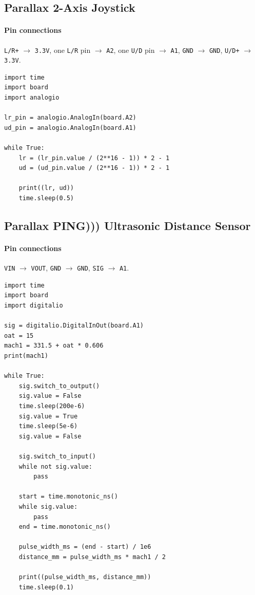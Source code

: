 \documentclass[11pt]{article}
\begin{document}
\subsection{Parallax 2-Axis Joystick}
\paragraph{Pin connections} \texttt{L/R+} $\rightarrow$ \texttt{3.3V}, one \texttt{L/R} pin $\rightarrow$ \texttt{A2}, one \texttt{U/D} pin $\rightarrow$ \texttt{A1}, \texttt{GND} $\rightarrow$ \texttt{GND}, \texttt{U/D+} $\rightarrow$ \texttt{3.3V}.

\begin{lstlisting}
import time
import board
import analogio

lr_pin = analogio.AnalogIn(board.A2)
ud_pin = analogio.AnalogIn(board.A1)

while True:
    lr = (lr_pin.value / (2**16 - 1)) * 2 - 1
    ud = (ud_pin.value / (2**16 - 1)) * 2 - 1

    print((lr, ud))
    time.sleep(0.5)
\end{lstlisting}

\subsection{Parallax PING))) Ultrasonic Distance Sensor}
\paragraph{Pin connections} \texttt{VIN} $\rightarrow$ \texttt{VOUT}, \texttt{GND} $\rightarrow$ \texttt{GND}, \texttt{SIG} $\rightarrow$ \texttt{A1}.

\begin{lstlisting}
import time
import board
import digitalio

sig = digitalio.DigitalInOut(board.A1)
oat = 15
mach1 = 331.5 + oat * 0.606
print(mach1)

while True:
    sig.switch_to_output()
    sig.value = False
    time.sleep(200e-6)
    sig.value = True
    time.sleep(5e-6)
    sig.value = False

    sig.switch_to_input()
    while not sig.value:
        pass

    start = time.monotonic_ns()
    while sig.value:
        pass
    end = time.monotonic_ns()

    pulse_width_ms = (end - start) / 1e6
    distance_mm = pulse_width_ms * mach1 / 2

    print((pulse_width_ms, distance_mm))
    time.sleep(0.1)
\end{lstlisting}
\end{document}
